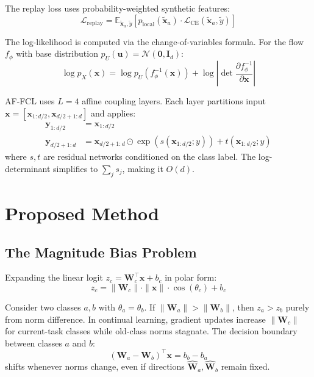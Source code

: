 \documentclass[conference]{IEEEtran}
\begin{document}
The replay loss uses probability-weighted synthetic features:
\begin{equation}
\mathcal{L}_{\text{replay}} = \mathbb{E}_{\tilde{\mathbf{x}}_a, \tilde{y}}\!\left[p_{\text{local}}(\tilde{\mathbf{x}}_a) \cdot \mathcal{L}_{\text{CE}}(\tilde{\mathbf{x}}_a, \tilde{y})\right]
\end{equation}

The log-likelihood is computed via the change-of-variables formula. For the flow $f_\phi$ with base distribution $p_U(\mathbf{u}) = \mathcal{N}(\mathbf{0},\mathbf{I}_d)$:
\begin{equation}
\log p_X(\mathbf{x}) = \log p_U(f_\phi^{-1}(\mathbf{x})) + \log\!\left|\det\frac{\partial f_\phi^{-1}}{\partial \mathbf{x}}\right|
\end{equation}

AF-FCL uses $L{=}4$ affine coupling layers. Each layer partitions input $\mathbf{x} = [\mathbf{x}_{1:d/2}, \mathbf{x}_{d/2+1:d}]$ and applies:
\begin{align}
\mathbf{y}_{1:d/2} &= \mathbf{x}_{1:d/2} \\
\mathbf{y}_{d/2+1:d} &= \mathbf{x}_{d/2+1:d} \odot \exp(s(\mathbf{x}_{1:d/2}; y)) + t(\mathbf{x}_{1:d/2}; y)
\end{align}
where $s,t$ are residual networks conditioned on the class label. The log-determinant simplifies to $\sum_j s_j$, making it $O(d)$.

\section{Proposed Method}

\subsection{The Magnitude Bias Problem}
Expanding the linear logit $z_c = \mathbf{W}_c^\top\mathbf{x} + b_c$ in polar form:
\begin{equation}
z_c = \|\mathbf{W}_c\| \cdot \|\mathbf{x}\| \cdot \cos(\theta_c) + b_c
\end{equation}

Consider two classes $a,b$ with $\theta_a = \theta_b$. If $\|\mathbf{W}_a\| > \|\mathbf{W}_b\|$, then $z_a > z_b$ purely from norm difference. In continual learning, gradient updates increase $\|\mathbf{W}_c\|$ for current-task classes while old-class norms stagnate. The decision boundary between classes $a$ and $b$:
\begin{equation}
(\mathbf{W}_a - \mathbf{W}_b)^\top\mathbf{x} = b_b - b_a
\end{equation}
shifts whenever norms change, even if directions $\hat{\mathbf{W}}_a, \hat{\mathbf{W}}_b$ remain fixed.
\end{document}
